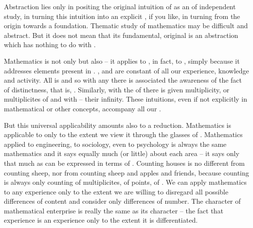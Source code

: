 Abstraction lies only in positing the original intuition of  as an  of independent study, in turning this 
intuition into an explicit , if you like, in 
turning from the origin towards a foundation. 
Thematic study of mathematics may be difficult and abstract. But it 
does not mean that its fundamental, original  is an 
abstraction which has nothing to do with .

Mathematics is not only  but
also  -- it applies to , in fact, to
, simply because it addresses elements present in . 
,  and  
are constant   of all our experience, knowledge and
activity.  All  is  and so with any
 there is associated the awareness of the fact of
distinctness, that is, . Similarly, with the 
 of  there is given multiplicity, or 
multiplicites of  and with  -- their 
infinity. These intuitions, even if not  explicitly in 
mathematical or other concepts, accompany all our .

But this universal applicability amounts also to a reduction. Mathematics is
applicable to  only to the extent we view it through the
glasses of .  Mathematics applied to engineering, to
sociology, even to psychology is always the same mathematics and it says equally
much (or little) about each area -- it says only that much as can be expressed
in terms of .  Counting houses is no different from
counting sheep, nor from counting sheep and apples and friends, because counting
is always only counting of multiplicites, of points, of .
We can apply mathematics to any experience only to the extent we are willing to
disregard all possible differences of content and consider only differences of
number. The  character of mathematical enterprise is really the
same as its  character -- the fact that experience is an experience
only to the extent it is differentiated.

